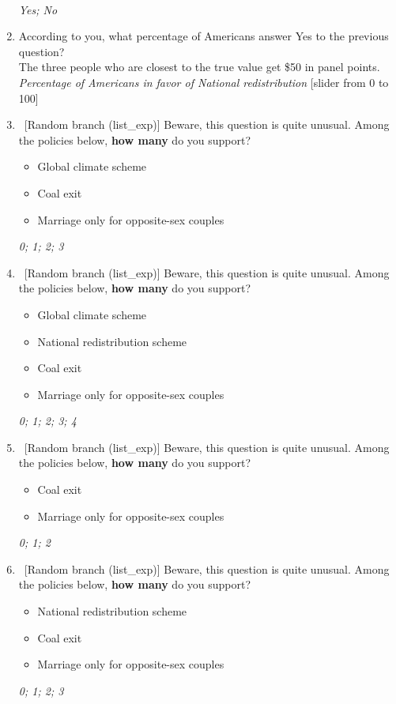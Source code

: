\begin{enumerate}[resume]
\\ \textit{Yes; No}
\item According to you, what percentage of Americans answer Yes to the previous question?\\
The three people who are closest to the true value get \$50 in panel points.
\\ \textit{Percentage of Americans in favor of National redistribution } [slider from 0 to 100]
\item ~[Random branch (list\_exp)] Beware, this question is quite unusual. Among the policies below, \textbf{how many} do you support?
\begin{itemize} 
    \item Global climate scheme 
    \item Coal exit  
    \item Marriage only for opposite-sex couples
\end{itemize}
\textit{0; 1; 2; 3}
\item ~[Random branch (list\_exp)] Beware, this question is quite unusual. Among the policies below, \textbf{how many} do you support?
\begin{itemize} 
    \item Global climate scheme 
    \item National redistribution scheme
    \item Coal exit  
    \item Marriage only for opposite-sex couples
\end{itemize}
\textit{0; 1; 2; 3; 4}
\item ~[Random branch (list\_exp)] Beware, this question is quite unusual. Among the policies below, \textbf{how many} do you support?
\begin{itemize} 
    \item Coal exit  
    \item Marriage only for opposite-sex couples
\end{itemize}
\textit{0; 1; 2}
\item ~[Random branch (list\_exp)] Beware, this question is quite unusual. Among the policies below, \textbf{how many} do you support?
\begin{itemize} 
    \item National redistribution scheme 
    \item Coal exit  
    \item Marriage only for opposite-sex couples
\end{itemize}
\textit{0; 1; 2; 3}
\end{enumerate}

